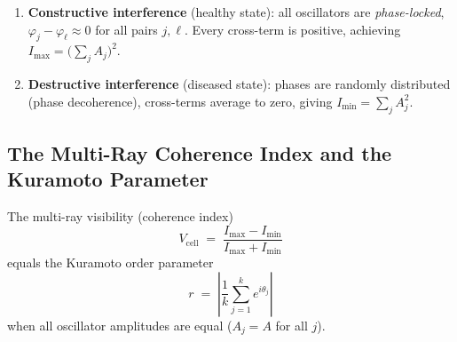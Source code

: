 \begin{definition}
\label{def:ch04-interference-regimes}
\begin{enumerate}[label=(\roman*)]
    \item \textbf{Constructive interference} (healthy state): all oscillators
          are \emph{phase-locked}, $\varphi_j - \varphi_\ell \approx 0$ for
          all pairs $j, \ell$.  Every cross-term is positive, achieving
          $I_{\max} = \bigl(\sum_j A_j\bigr)^2$.
    \item \textbf{Destructive interference} (diseased state): phases are
          randomly distributed (phase decoherence), cross-terms average to
          zero, giving $I_{\min} = \sum_j A_j^2$.
\end{enumerate}
\end{definition}

\subsection{The Multi-Ray Coherence Index and the Kuramoto Parameter}

\begin{theorem}
\label{thm:ch04-coherence-kuramoto}
The multi-ray visibility (coherence index)
\begin{equation}
\label{eq:ch04-vcell}
    V_{\mathrm{cell}} \;=\;
        \frac{I_{\max} - I_{\min}}{I_{\max} + I_{\min}}
\end{equation}
equals the Kuramoto order parameter
\begin{equation}
\label{eq:ch04-kuramoto}
    r \;=\; \left|\frac{1}{k}\sum_{j=1}^{k} e^{i\theta_j}\right|
\end{equation}
when all oscillator amplitudes are equal ($A_j = A$ for all $j$).
\end{theorem}

